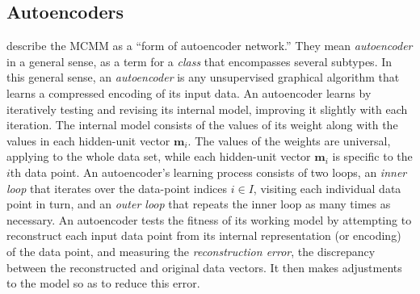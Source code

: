 \subsection{Autoencoders}
\label{sec:autoencoders}
\citet[][p. 2]{dayan-and-zemel:95} describe the MCMM as a ``form of autoencoder network.'' 
They mean \emph{autoencoder} in a general sense, as a term for a \emph{class} that encompasses several subtypes.  
In this general sense, an \emph{autoencoder} is any unsupervised graphical algorithm that
learns a compressed encoding of its input data. 
An autoencoder learns by iteratively testing and revising its internal model, improving it slightly with each iteration. 
The internal model consists of the values of its weight along with 
the values in each hidden-unit vector $\textbf{m}_i$. The values 
of the weights are universal, applying to the whole data set, while 
each hidden-unit vector $\textbf{m}_i$ is specific to the $i$th data point. 
An autoencoder's learning process consists of two
loops, an \emph{inner loop} that iterates over the data-point indices $i \in I$, 
visiting each individual data point in turn, and an \emph{outer loop} that repeats 
the inner loop as many times as necessary. 
An autoencoder tests the fitness of its working model by attempting to reconstruct each input data 
point from its internal representation (or encoding) of the data point, %
and measuring the \emph{reconstruction error}, the discrepancy between the reconstructed and original data vectors.  
It then makes adjustments to the model so as to reduce this error.

